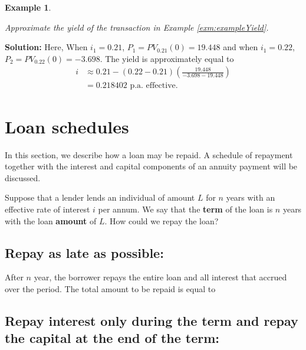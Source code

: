 \documentclass[landscape, 20pt]{extreport}
\theoremstyle{definition}
\theoremstyle{definition}
\newtheorem{example}{Example}[chapter]
\theoremstyle{definition}
\theoremstyle{definition}
\theoremstyle{remark}
\begin{document}
\newpage \begin{example}
\protect\hypertarget{exm:unlabeled-div-40}{}\label{exm:unlabeled-div-40}

\emph{Approximate the yield of the transaction in Example \ref{exm:exampleYield}.}

\end{example}

\textbf{Solution:} Here, When \(i_1 = 0.21\), \(P_1 = PV_{0.21}(0) = 19.448\) and
when \(i_1 = 0.22\), \(P_2 = PV_{0.22}(0) = -3.698.\) The yield is
approximately equal to \[\begin{aligned}
 i &\approx 0.21 - (0.22 - 0.21) \left(  \frac{19.448}{-3.698 - 19.448} \right) \\
   &= 0.218402 \text{ p.a. effective.}\end{aligned}\]

\hypertarget{loan-schedules}{%
\section{Loan schedules}\label{loan-schedules}}

In this section, we describe how a loan may be repaid. A schedule of
repayment together with the interest and capital components of an
annuity payment will be discussed.

Suppose that a lender lends an individual of amount \(L\) for \(n\) years
with an effective rate of interest \(i\) per annum. We say that the
\textbf{term} of the loan is \(n\) years with the loan \textbf{amount} of \(L\). How
could we repay the loan?

\hypertarget{repay-as-late-as-possible}{%
\subsection*{Repay as late as possible:}\label{repay-as-late-as-possible}}

After \(n\) year, the borrower repays the entire loan and all interest
that accrued over the period. The total amount to be repaid is equal to

\hypertarget{repay-interest-only-during-the-term-and-repay-the-capital-at-the-end-of-the-term}{%
\subsection*{Repay interest only during the term and repay the capital at the end of the term:}\label{repay-interest-only-during-the-term-and-repay-the-capital-at-the-end-of-the-term}}
\end{document}
